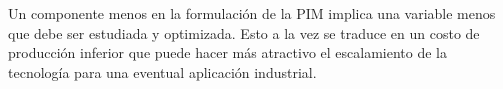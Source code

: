 
Un componente menos en la formulación de la PIM implica una variable menos que debe ser estudiada y optimizada. Esto a la vez se traduce en un costo de producción inferior que puede hacer más atractivo el escalamiento de la tecnología para una eventual aplicación industrial.


